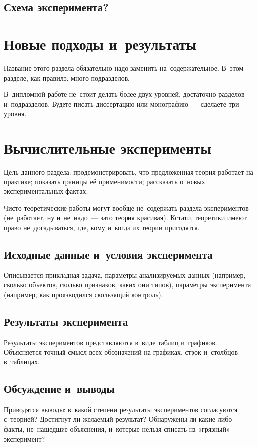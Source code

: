 \documentclass[12pt,fleqn]{article}
\begin{document}
\subsection{Схема эксперимента?}

\newpage
\section{Новые подходы и~результаты}

Название этого раздела обязательно надо заменить на~содержательное. 
В~этом разделе, как правило, много подразделов. 

В~дипломной работе не~стоит делать более двух уровней,
достаточно разделов и~подразделов.
Будете писать диссертацию или монографию~--- сделаете три уровня. 
  
\section{Вычислительные эксперименты}

Цель данного раздела:
продемонстрировать, что предложенная теория работает на практике;
показать границы её применимости;
рассказать о~новых экспериментальных фактах.

Чисто теоретические работы могут вообще не~содержать раздела экспериментов
(не~работает, ну и~не~надо~--- зато теория красивая).
Кстати, теоретики имеют право не~догадываться, где, кому и~когда их теории пригодятся.

\subsection{Исходные данные и~условия эксперимента}
Описывается прикладная задача, параметры анализируемых данных 
(например, сколько объектов, сколько признаков, каких они типов), 
параметры эксперимента 
(например, как производился скользящий контроль). 

\subsection{Результаты эксперимента}
Результаты экспериментов представляются в~виде таблиц и~графиков. 
Объясняется точный смысл всех обозначений на графиках, строк и~столбцов в~таблицах. 

\subsection{Обсуждение и~выводы}
Приводятся выводы: 
в~какой степени результаты экспериментов согласуются с~теорией? 
Достигнут ли желаемый результат? 
Обнаружены ли какие-либо факты, не~нашедшие объяснения, и~которые нельзя списать на «грязный» эксперимент?
\end{document}
